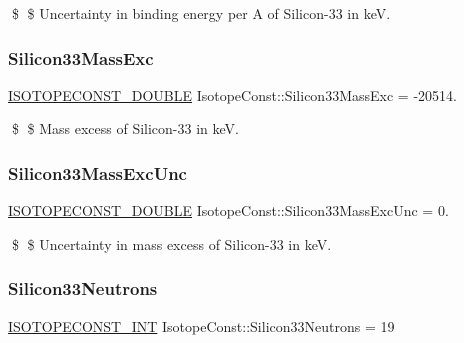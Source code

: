 \$ \$ Uncertainty in binding energy per A of Silicon-\/33 in keV. \mbox{\label{group___isotope_const-_silicon-_si33_ga7782433d1118fc9c241efdc60ffedc9a}} 
\subsubsection{\texorpdfstring{Silicon33\+Mass\+Exc}{Silicon33MassExc}}
{\footnotesize\ttfamily \mbox{\hyperlink{group___isotope_const-_macros_ga8f45a7272ce02c0b4c65c44636ed719a}{I\+S\+O\+T\+O\+P\+E\+C\+O\+N\+S\+T\+\_\+\+D\+O\+U\+B\+LE}} Isotope\+Const\+::\+Silicon33\+Mass\+Exc = -\/20514.}

\$ \$ Mass excess of Silicon-\/33 in keV. \mbox{\label{group___isotope_const-_silicon-_si33_ga39bcfea7518d5cbe7b3ad2c4f33ecada}} 
\subsubsection{\texorpdfstring{Silicon33\+Mass\+Exc\+Unc}{Silicon33MassExcUnc}}
{\footnotesize\ttfamily \mbox{\hyperlink{group___isotope_const-_macros_ga8f45a7272ce02c0b4c65c44636ed719a}{I\+S\+O\+T\+O\+P\+E\+C\+O\+N\+S\+T\+\_\+\+D\+O\+U\+B\+LE}} Isotope\+Const\+::\+Silicon33\+Mass\+Exc\+Unc = 0.}

\$ \$ Uncertainty in mass excess of Silicon-\/33 in keV. \mbox{\label{group___isotope_const-_silicon-_si33_ga2e7a291bcc0019201f35ef646ea1e7c3}} 
\subsubsection{\texorpdfstring{Silicon33\+Neutrons}{Silicon33Neutrons}}
{\footnotesize\ttfamily \mbox{\hyperlink{group___isotope_const-_macros_ga5f18360b3e99483a35c32d789e62621c}{I\+S\+O\+T\+O\+P\+E\+C\+O\+N\+S\+T\+\_\+\+I\+NT}} Isotope\+Const\+::\+Silicon33\+Neutrons = 19}

